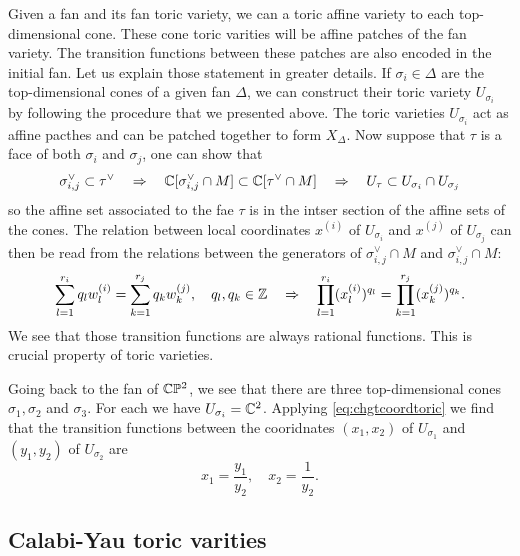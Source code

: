         Given a fan and its fan toric variety, we can a toric affine variety to each top-dimensional cone. These cone toric varities will be affine patches of the fan variety. The transition functions between these patches are also encoded in the initial fan. Let us explain those statement in greater details. If $\sigma_i\in\Delta$ are the top-dimensional cones of a given fan $\Delta$, we can construct their toric variety $U_{\sigma_i}$ by following the procedure that we presented above. The toric varieties $U_{\sigma_i}$ act as affine pacthes and can be patched together to form $X_\Delta$. Now suppose that $\tau$ is a face of both $\sigma_i$ and $\sigma_j$, one can show that
        \begin{equation}
            \sigma^\vee_{i,j}\subset\tau^\vee\quad\Rightarrow\quad \mathbb{C}[\sigma^\vee_{i,j}\cap M]\subset\mathbb{C}[\tau^\vee\cap M]\quad\Rightarrow\quad U_\tau\subset U_{\sigma_i}\cap U_{\sigma_j}
        \end{equation}
        so the affine set associated to the fae $\tau$ is in the intser section of the affine sets of the cones. The relation between local coordinates $x^(i)$ of $U_{\sigma_i}$ and $x^(j)$ of $U_{\sigma_j}$ can then be read from the relations between the generators of $\sigma^\vee_{i,j}\cap M$ and $\sigma^\vee_{i,j}\cap M$:
        \begin{equation}
            \sum^{r_i}_{l=1}q_lw^{(i)}_l = \sum^{r_j}_{k=1}q_kw^{(j)}_k,\quad q_l,q_k\in\mathbb{Z}\quad\Rightarrow\quad \prod^{r_i}_{l=1}(x^{(i)}_l)^{q_l} = \prod^{r_j}_{k=1}(x^{(j)}_k)^{q_k}.\label{eq:chgtcoordtoric}
        \end{equation}
        We see that those transition functions are always rational functions. This is crucial property of toric varieties.

        \begin{examp*}
            Going back to the fan of $\mathbb{C}\mathbb{P}^2$, we see that there are three top-dimensional cones $\sigma_1,\sigma_2$ and $\sigma_3$. For each we have $U_{\sigma_i}=\mathbb{C}^2$. Applying \eqref{eq:chgtcoordtoric} we find that the transition functions between the cooridnates $(x_1,x_2)$ of $U_{\sigma_1}$ and $(y_1,y_2)$ of $U_{\sigma_2}$ are
            \begin{equation}
                x_1=\frac{y_1}{y_2},\quad x_2=\frac{1}{y_2}.
            \end{equation}
        \end{examp*}

    \subsection{Calabi-Yau toric varities}

